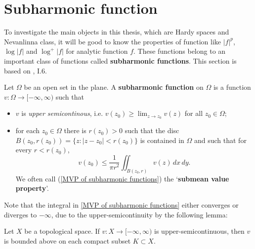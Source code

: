 \section{Subharmonic function}
\label{subsec:subharmonic}
To investigate the main objects in this thesis,
which are Hardy spaces and Nevanlinna class, it will be good to know the properties of 
function like $|f|^p$, $\log |f|$ and $\log^+ |f|$
for analytic function $f$. These functions belong to an important class of functions called 
\textbf{subharmonic functions}. This section is based on \cite{garnett2006bounded}, I.6.
\begin{definition}
Let $\Omega$ be an open set in the plane. A \textbf{subharmonic function} on $\Omega$ is a function
$v : \Omega \to [-\infty, \infty)$ such that
\begin{itemize}
  \item[(a)] $v$ is \emph{upper semicontinous}, i.e. $v(z_0)\geq \lim_{z\rightarrow z_0}v(z)$ 
  for all $z_0\in\Omega$;
  \item[(b)] for each $z_0 \in \Omega$ there is $r(z_0) > 0$ such that the disc 
$B(z_0, r(z_0)) = \{z : |z - z_0| < r(z_0)\}$ is contained in $\Omega$ and 
such that for every $r < r(z_0)$,
\begin{equation}\label{MVP of subharmonic functions}
  v(z_0) \leq \frac{1}{\pi r^2} \iint_{B(z_0,r)} v(z)\, dx\, dy.
\end{equation}
We often call (\ref{MVP of subharmonic functions}) the `\textbf{submean value property}'.
\end{itemize}
\end{definition}
\begin{remark}
Note that the integral in \ref{MVP of subharmonic functions} either
converges or diverges to $-\infty$, due to the upper-semicontinuity by the following
lemma:
\begin{lemma}\label{boundedness of uppersemicont fct}
Let $X$ be a topological space.
If $v:X\rightarrow [-\infty,\infty)$ is upper-semicontinuous, then $v$ is bounded
above on each compact subset $K\subset X$.
\end{lemma}
\end{remark}

